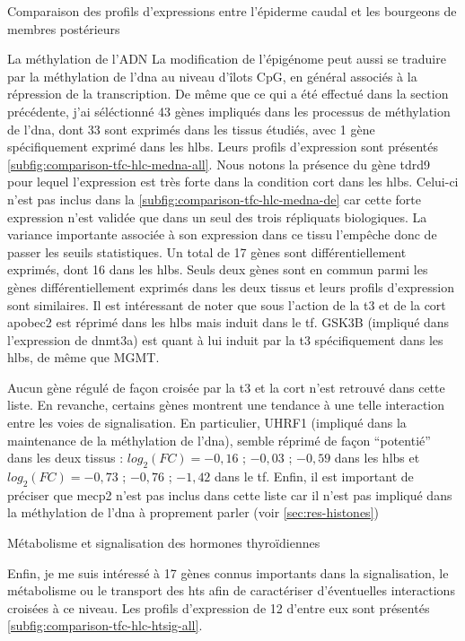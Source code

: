 \documentclass[../main.tex]{subfiles}
\begin{document}
\begin{chapter}{Comparaison des profils d'expressions entre l'épiderme caudal et les bourgeons de membres postérieurs}
\begin{section}{La méthylation de l'ADN}
La modification de l'épigénome peut aussi se traduire par la méthylation de l'\gls{dna} au niveau d'îlots CpG, en général associés à la répression de la transcription.
De même que ce qui a été effectué dans la section précédente, j'ai séléctionné 43 gènes impliqués dans les processus de méthylation de l'\gls{dna}, dont 33 sont exprimés dans les tissus étudiés, avec 1 gène spécifiquement exprimé dans les \glspl{hlb}.
Leurs profils d'expression sont présentés \autoref{subfig:comparison-tfc-hlc-medna-all}.
Nous notons la présence du gène \gls{tdrd9} pour lequel l'expression est très forte dans la condition \gls{cort} dans les \glspl{hlb}.
Celui-ci n'est pas inclus dans la \autoref{subfig:comparison-tfc-hlc-medna-de} car cette forte expression n'est validée que dans un seul des trois répliquats biologiques.
La variance importante associée à son expression dans ce tissu l'empêche donc de passer les seuils statistiques.
Un total de 17 gènes sont différentiellement exprimés, dont 16 dans les \glspl{hlb}.
Seuls deux gènes sont en commun parmi les gènes différentiellement exprimés dans les deux tissus et leurs profils d'expression sont similaires.
Il est intéressant de noter que sous l'action de la \gls{t3} et de la \gls{cort} \gls{apobec2} est réprimé dans les \glspl{hlb} mais induit dans le \gls{tf}.
GSK3B (impliqué dans l'expression de \gls{dnmt3a}) est quant à lui induit par la \gls{t3} spécifiquement dans les \glspl{hlb}, de même que MGMT.
\par
Aucun gène régulé de façon croisée par la \gls{t3} et la \gls{cort} n'est retrouvé dans cette liste.
En revanche, certains gènes montrent une tendance à une telle interaction entre les voies de signalisation.
En particulier, UHRF1 (impliqué dans la maintenance de la méthylation de l'\gls{dna}), semble réprimé de façon ``potentié'' dans les deux tissus :
$log_2(FC)=-0,16$ ; $-0,03$ ; $-0,59$ dans les \glspl{hlb} et $log_2(FC)=-0,73$ ; $-0,76$ ; $-1,42$ dans le \gls{tf}.
Enfin, il est important de préciser que \gls{mecp2} n'est pas inclus dans cette liste car il n'est pas impliqué dans la méthylation de l'\gls{dna} à proprement parler (voir \autoref{sec:res-histones})



\end{section}


\begin{section}{Métabolisme et signalisation des hormones thyroïdiennes}

Enfin, je me suis intéressé à 17 gènes connus importants dans la signalisation, le métabolisme ou le transport des \glspl{ht} afin de caractériser d'éventuelles interactions croisées à ce niveau.
Les profils d'expression de 12 d'entre eux sont présentés \autoref{subfig:comparison-tfc-hlc-htsig-all}.


\end{section}
\end{chapter}
\end{document}
